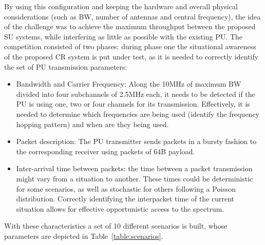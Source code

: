 By using this configuration and keeping the hardware and overall physical considerations (such as \ac{BW}, number of antennas and central frequency),
the idea of the challenge was to achieve the maximum throughput between the proposed \ac{SU} systems, while interfering as little as possible with the existing \ac{PU}. The competition consisted of two phases: during phase one the situational awareness of the proposed \ac{CR} system is put under test, as it is needed to correctly identify the set of \ac{PU} transmission parameters:

\begin{itemize}
    \item Bandwidth and Carrier Frequency: Along the 10MHz of maximum \ac{BW} divided into four subchannels of 2.5MHz each, it needs to be detected if the \ac{PU} is using one, two or four channels for its transmission. Effectively, it is needed to determine which frequencies are being used (identify the frequency hopping pattern) and when are they being used.
    \item Packet description: The \ac{PU} transmitter sends packets in a bursty fashion to the corresponding receiver using packets of 64B payload.
    \item Inter-arrival time between packets: the time between a packet transmission might vary from a situation to another. These times could be deterministic for some scenarios, as well as stochastic for others following a Poisson distribution. Correctly identifying the interpacket time of the current situation allows for effective opportunistic access to the spectrum.
\end{itemize}

With these characteristics a set of 10 different scenarios is built, whose parameters are depicted in Table~\ref{table:scenarios}.

